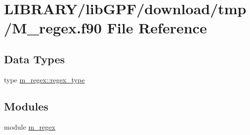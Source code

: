 \hypertarget{M__regex_8f90}{}\section{L\+I\+B\+R\+A\+R\+Y/lib\+G\+P\+F/download/tmp/\+M\+\_\+regex.f90 File Reference}
\label{M__regex_8f90}
\subsection*{Data Types}
\begin{DoxyCompactItemize}
\item 
type \hyperlink{structm__regex_1_1regex__type}{m\+\_\+regex\+::regex\+\_\+type}
\end{DoxyCompactItemize}
\subsection*{Modules}
\begin{DoxyCompactItemize}
\item 
module \hyperlink{namespacem__regex}{m\+\_\+regex}
\end{DoxyCompactItemize}
